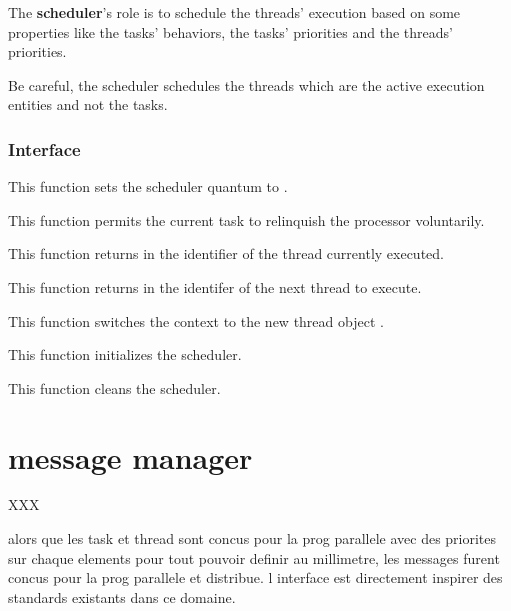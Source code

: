 The \textbf{scheduler}'s role is to schedule the threads' execution
based on some properties like the tasks' behaviors, the tasks' priorities
and the threads' priorities.

Be careful, the scheduler schedules the threads which are the active
execution entities and not the tasks.


%
%

\subsubsection{Interface}

	 {
	   This function sets the scheduler quantum to .
	 }

	 {
	   This function permits the current task to relinquish
	   the processor voluntarily.
	 }

	 {
	   This function returns in  the identifier
	   of the thread currently executed.
	 }

	 {
	   This function returns in  the identifer
	   of the next thread to execute.
	 }

	 {
	   This function switches the context to the new thread object
	   .
	 }

	 {
	   This function initializes the scheduler.
	 }

	 {
	   This function cleans the scheduler.
	 }

%
%

\section{message manager}

XXX

alors que les task et thread sont concus pour la prog parallele avec des
 priorites sur chaque elements pour tout pouvoir definir au millimetre,
 les messages furent concus pour la prog parallele et distribue.
 l interface est directement inspirer des standards existants dans ce domaine.

